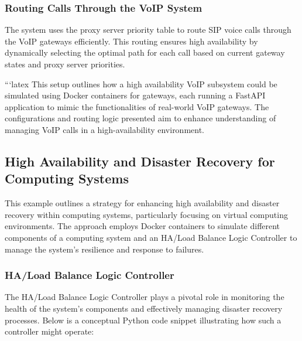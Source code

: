 \documentclass[12pt]{article}
\begin{document}
\subsubsection{Routing Calls Through the VoIP System}

The system uses the proxy server priority table to route SIP voice calls through the VoIP gateways efficiently. This routing ensures high availability by dynamically selecting the optimal path for each call based on current gateway states and proxy server priorities.

```latex
This setup outlines how a high availability VoIP subsystem could be simulated using Docker containers for gateways, each running a FastAPI application to mimic the functionalities of real-world VoIP gateways. The configurations and routing logic presented aim to enhance understanding of managing VoIP calls in a high-availability environment.

\subsection{High Availability and Disaster Recovery for Computing Systems}

This example outlines a strategy for enhancing high availability and disaster recovery within computing systems, particularly focusing on virtual computing environments. The approach employs Docker containers to simulate different components of a computing system and an HA/Load Balance Logic Controller to manage the system's resilience and response to failures.

\subsubsection{HA/Load Balance Logic Controller}

The HA/Load Balance Logic Controller plays a pivotal role in monitoring the health of the system's components and effectively managing disaster recovery processes. Below is a conceptual Python code snippet illustrating how such a controller might operate:
\end{document}
